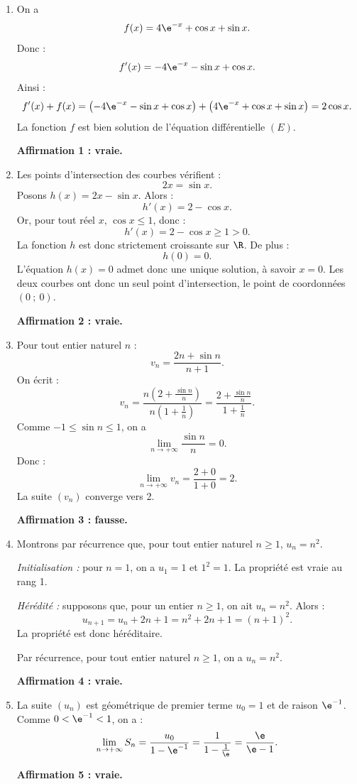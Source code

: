 \begin{enumerate}[itemsep=5mm]
	\item On a
	\[
	f(x)=4\e^{-x}+\cos x+\sin x.
	\]
	Donc :
	\[
	f'(x)=-4\e^{-x}-\sin x+\cos x.
	\]
	Ainsi :
	\[
	f'(x)+f(x)=\left(-4\e^{-x}-\sin x+\cos x\right)+\left(4\e^{-x}+\cos x+\sin x\right)=2\cos x.
	\]
	La fonction $f$ est bien solution de l'équation différentielle $(E)$.

	\medskip
	\textbf{Affirmation 1 : vraie.}

	\item Les points d'intersection des courbes vérifient :
	\[
	2x=\sin x.
	\]
	Posons $h(x)=2x-\sin x$.
	Alors :
	\[
	h'(x)=2-\cos x.
	\]
	Or, pour tout réel $x$, $\cos x\leqslant 1$, donc :
	\[
	h'(x)=2-\cos x\geqslant 1>0.
	\]
	La fonction $h$ est donc strictement croissante sur $\R$.
	De plus :
	\[
	h(0)=0.
	\]
	L'équation $h(x)=0$ admet donc une unique solution, à savoir $x=0$.
	Les deux courbes ont donc un seul point d'intersection, le point de coordonnées $(0~;~0)$.

	\medskip
	\textbf{Affirmation 2 : vraie.}

	\item Pour tout entier naturel $n$ :
	\[
	v_n=\dfrac{2n+\sin n}{n+1}.
	\]
	On écrit :
	\[
	v_n=\dfrac{n\left(2+\frac{\sin n}{n}\right)}{n\left(1+\frac{1}{n}\right)}
	=\dfrac{2+\frac{\sin n}{n}}{1+\frac{1}{n}}.
	\]
	Comme $-1\leqslant \sin n\leqslant 1$, on a
	\[
	\lim\limits_{n\to +\infty}\dfrac{\sin n}{n}=0.
	\]
	Donc :
	\[
	\lim\limits_{n\to +\infty} v_n=\dfrac{2+0}{1+0}=2.
	\]
	La suite $(v_n)$ converge vers 2.

	\medskip
	\textbf{Affirmation 3 : fausse.}

	\item Montrons par récurrence que, pour tout entier naturel $n\geqslant 1$, $u_n=n^2$.

	\emph{Initialisation :} pour $n=1$, on a $u_1=1$ et $1^2=1$. La propriété est vraie au rang 1.

	\emph{Hérédité :} supposons que, pour un entier $n\geqslant 1$, on ait $u_n=n^2$.
	Alors :
	\[
	u_{n+1}=u_n+2n+1=n^2+2n+1=(n+1)^2.
	\]
	La propriété est donc héréditaire.

	Par récurrence, pour tout entier naturel $n\geqslant 1$, on a $u_n=n^2$.

	\medskip
	\textbf{Affirmation 4 : vraie.}

	\item La suite $(u_n)$ est géométrique de premier terme $u_0=1$ et de raison $\e^{-1}$.
	Comme $0<\e^{-1}<1$, on a :
	\[
	\lim\limits_{n\to +\infty} S_n=\dfrac{u_0}{1-\e^{-1}}
	=\dfrac{1}{1-\frac{1}{\e}}
	=\dfrac{\e}{\e-1}.
	\]

	\medskip
	\textbf{Affirmation 5 : vraie.}
\end{enumerate}
